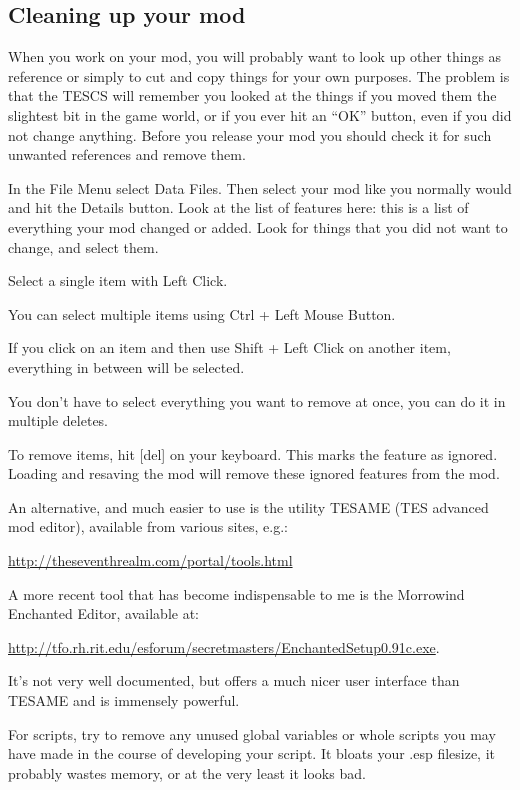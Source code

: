 \documentclass[
]{article}
\begin{document}
\hypertarget{cleaning-up-your-mod}{%
\subsection{\texorpdfstring{\hfill\break
Cleaning up your
mod}{ Cleaning up your mod}}\label{cleaning-up-your-mod}}

When you work on your mod, you will probably want to look up other
things as reference or simply to cut and copy things for your own
purposes. The problem is that the TESCS will remember you looked at the
things if you moved them the slightest bit in the game world, or if you
ever hit an ``OK'' button, even if you did not change anything. Before
you release your mod you should check it for such unwanted references
and remove them.

In the File Menu select Data Files. Then select your mod like you
normally would and hit the Details button. Look at the list of features
here: this is a list of everything your mod changed or added. Look for
things that you did not want to change, and select them.

Select a single item with Left Click.

You can select multiple items using Ctrl + Left Mouse Button.

If you click on an item and then use Shift + Left Click on another item,
everything in between will be selected.

You don't have to select everything you want to remove at once, you can
do it in multiple deletes.

To remove items, hit {[}del{]} on your keyboard. This marks the feature
as ignored. Loading and resaving the mod will remove these ignored
features from the mod.

An alternative, and much easier to use is the utility TESAME (TES
advanced mod editor), available from various sites, e.g.:

\url{http://theseventhrealm.com/portal/tools.html}

A more recent tool that has become indispensable to me is the Morrowind
Enchanted Editor, available at:

\url{http://tfo.rh.rit.edu/esforum/secretmasters/EnchantedSetup0.91c.exe}.

It's not very well documented, but offers a much nicer user interface
than TESAME and is immensely powerful.

For scripts, try to remove any unused global variables or whole scripts
you may have made in the course of developing your script. It bloats
your .esp filesize, it probably wastes memory, or at the very least it
looks bad.
\end{document}
